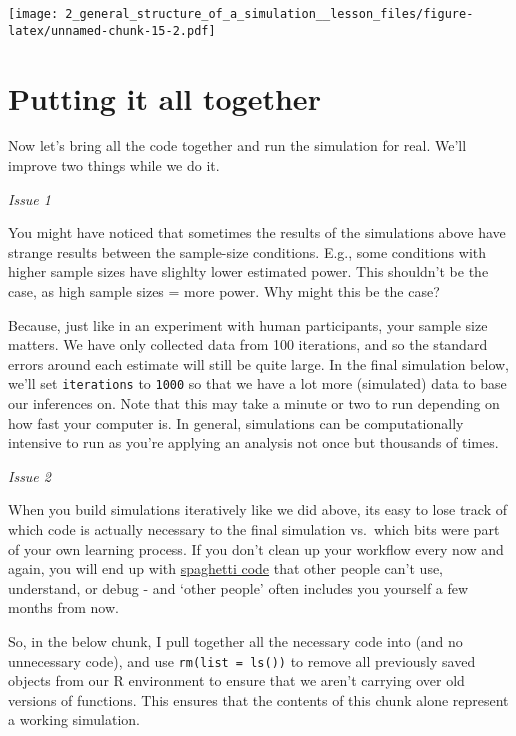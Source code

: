 \documentclass[
]{article}
\begin{document}
\texttt{[image: 2\_general\_structure\_of\_a\_simulation\_\_lesson\_files/figure-latex/unnamed-chunk-15-2.pdf]}

\hypertarget{putting-it-all-together}{%
\section{Putting it all together}\label{putting-it-all-together}}

Now let's bring all the code together and run the simulation for real.
We'll improve two things while we do it.

\emph{Issue 1}

You might have noticed that sometimes the results of the simulations
above have strange results between the sample-size conditions. E.g.,
some conditions with higher sample sizes have slighlty lower estimated
power. This shouldn't be the case, as high sample sizes = more power.
Why might this be the case?

Because, just like in an experiment with human participants, your sample
size matters. We have only collected data from 100 iterations, and so
the standard errors around each estimate will still be quite large. In
the final simulation below, we'll set \texttt{iterations} to
\texttt{1000} so that we have a lot more (simulated) data to base our
inferences on. Note that this may take a minute or two to run depending
on how fast your computer is. In general, simulations can be
computationally intensive to run as you're applying an analysis not once
but thousands of times.

\emph{Issue 2}

When you build simulations iteratively like we did above, its easy to
lose track of which code is actually necessary to the final simulation
vs.~which bits were part of your own learning process. If you don't
clean up your workflow every now and again, you will end up with
\href{https://en.wikipedia.org/wiki/Spaghetti_code}{spaghetti code} that
other people can't use, understand, or debug - and `other people' often
includes you yourself a few months from now.

So, in the below chunk, I pull together all the necessary code into (and
no unnecessary code), and use \texttt{rm(list\ =\ ls())} to remove all
previously saved objects from our R environment to ensure that we aren't
carrying over old versions of functions. This ensures that the contents
of this chunk alone represent a working simulation.
\end{document}
